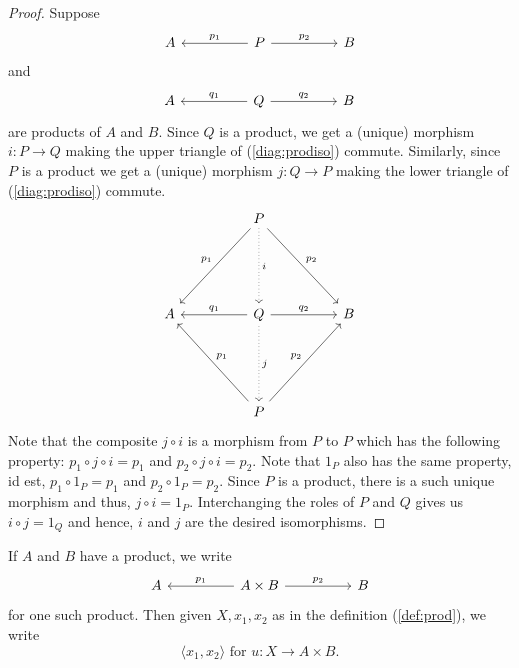 \begin{proof}
	Suppose
	\begin{equation*} 
		\begin{tikzcd}
			A && P \arrow[ll, "p_1"'] \arrow[rr, "p_2"] && B
		\end{tikzcd}
	\end{equation*}
	and
	\begin{equation*} 
		\begin{tikzcd}
			A && Q \arrow[ll, "q_1"'] \arrow[rr, "q_2"] && B
		\end{tikzcd}
	\end{equation*}
	are products of $A$ and $B.$ Since $Q$ is a product, we get a (unique) morphism $i:P \to Q$ making the upper triangle of (\ref{diag:prodiso}) commute. Similarly, since $P$ is a product we get a (unique) morphism $j:Q\to P$ making the lower triangle of (\ref{diag:prodiso}) commute.
	\begin{equation} \label{diag:prodiso}
		\begin{tikzcd}
			&& P \arrow[llddd, "p_1"'] \arrow[rrddd, "p_2"] \arrow[ddd, dotted, "i"] &&\\
			&&&&\\&&&&\\
			A && Q \arrow[ll, "q_1"'] \arrow[rr, "q_2"] \arrow[ddd, dotted, "j"] && B\\
			&&&&\\&&&&\\
			&& P \arrow[lluuu, "p_1"'] \arrow[rruuu, "p_2"] &&
		\end{tikzcd}
	\end{equation}
	Note that the composite $j\circ i$ is a morphism from $P$ to $P$ which has the following property: $p_1 \circ j \circ i = p_1$ and $p_2 \circ j \circ i = p_2.$ Note that $1_P$ also has the same property, id est, $p_1 \circ 1_P = p_1$ and $p_2 \circ 1_P = p_2.$ Since $P$ is a product, there is a such unique morphism and thus, $j\circ i = 1_P.$ Interchanging the roles of $P$ and $Q$ gives us $i \circ j = 1_Q$ and hence, $i$ and $j$ are the desired isomorphisms.
\end{proof}
If $A$ and $B$ have a product, we write
\begin{equation} 
	\begin{tikzcd}
		A && A \times B \arrow[ll, "p_1"'] \arrow[rr, "p_2"] && B
	\end{tikzcd}
\end{equation}
for one such product. Then given $X, x_1, x_2$ as in the definition (\ref{def:prod}), we write
\begin{equation} \label{eq:prodpair}
	\langle x_1, x_2\rangle \text{ for } u:X\to A\times B.
\end{equation}
